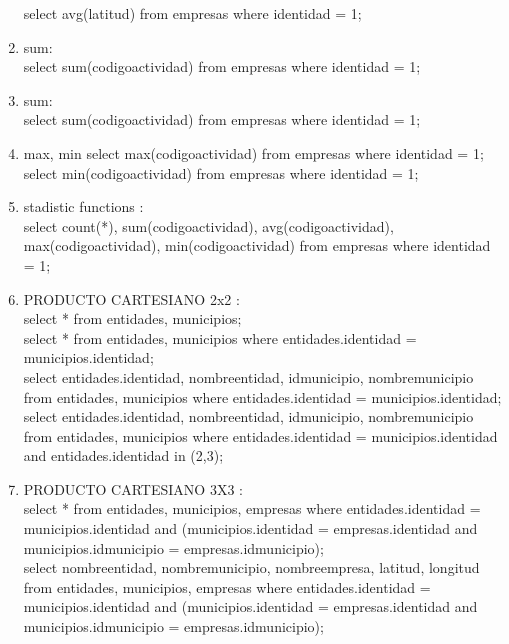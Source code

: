\documentclass[10pt]{article}         %
\begin{document}
\begin{enumerate}
   select avg(latitud)  from empresas where identidad = 1;
\item sum: \\
   select sum(codigoactividad)  from empresas where identidad = 1;   
\item sum: \\
   select sum(codigoactividad)  from empresas where identidad = 1;   
\item max, min
   select max(codigoactividad)  from empresas where identidad = 1;
   select min(codigoactividad)  from empresas where identidad = 1;   
\item stadistic functions : \\
select count(*), sum(codigoactividad), avg(codigoactividad), max(codigoactividad), min(codigoactividad)  from empresas where identidad = 1;

\item PRODUCTO CARTESIANO 2x2 : \\
 select * from entidades, municipios; \\     
 select * from entidades, municipios where entidades.identidad = municipios.identidad; \\
 select entidades.identidad, nombreentidad, idmunicipio, nombremunicipio from entidades, municipios where entidades.identidad = municipios.identidad;\\
 select entidades.identidad, nombreentidad, idmunicipio, nombremunicipio from entidades, municipios where entidades.identidad = municipios.identidad and entidades.identidad in (2,3);
 
\item PRODUCTO CARTESIANO 3X3 : \\
select * from entidades, municipios, empresas where entidades.identidad = municipios.identidad and (municipios.identidad = empresas.identidad and municipios.idmunicipio = empresas.idmunicipio); \\
select nombreentidad, nombremunicipio, nombreempresa, latitud, longitud from entidades, municipios, empresas where entidades.identidad = municipios.identidad and (municipios.identidad = empresas.identidad and municipios.idmunicipio = empresas.idmunicipio);


\end{enumerate}
\end{document}
